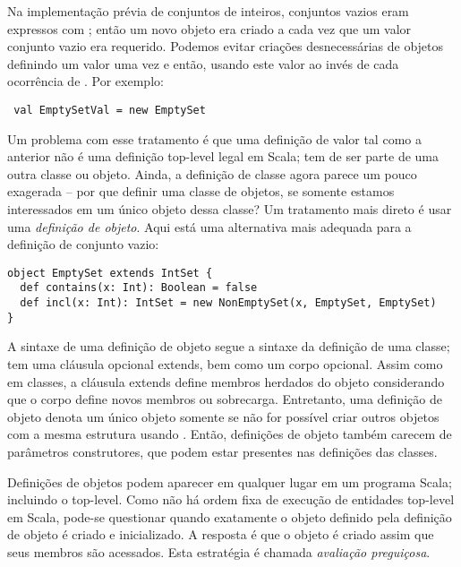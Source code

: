Na implementa\c{c}\~{a}o pr\'{e}via de conjuntos de inteiros, conjuntos vazios eram expressos
com ; ent\~{a}o um novo objeto era criado a cada vez que um valor
conjunto vazio era requerido. Podemos evitar cria\c{c}\~{o}es desnecess\'{a}rias de objetos 
definindo um valor  uma vez e ent\~{a}o, usando este valor ao inv\'{e}s de cada 
ocorr\^{e}ncia de . Por exemplo:
 \begin{lstlisting}
 val EmptySetVal = new EmptySet
 \end{lstlisting}

Um problema com esse tratamento \'{e} que uma defini\c{c}\~{a}o de valor tal como a anterior
n\~{a}o \'{e} uma defini\c{c}\~{a}o top-level legal em Scala; tem de ser parte de uma outra classe 
ou objeto. Ainda, a defini\c{c}\~{a}o de classe  agora parece um pouco exagerada -- 
por que definir uma classe de objetos, se somente estamos interessados em um \'{u}nico objeto 
dessa classe? Um tratamento mais direto \'{e} usar uma {\em defini\c{c}\~{a}o de objeto}. Aqui est\'{a} 
uma alternativa mais adequada para a defini\c{c}\~{a}o de conjunto vazio:
\begin{lstlisting}
object EmptySet extends IntSet {
  def contains(x: Int): Boolean = false
  def incl(x: Int): IntSet = new NonEmptySet(x, EmptySet, EmptySet)
}
\end{lstlisting}

A sintaxe de uma defini\c{c}\~{a}o de objeto segue a sintaxe da defini\c{c}\~{a}o de uma 
classe; tem uma cl\'{a}usula opcional extends, bem como um corpo opcional. 
Assim como em classes, a cl\'{a}usula extends define membros herdados do objeto 
considerando que o corpo define novos membros ou sobrecarga. Entretanto, uma 
defini\c{c}\~{a}o de objeto denota um \'{u}nico objeto somente se n\~{a}o for poss\'{i}vel criar
outros objetos com a mesma estrutura usando . Ent\~{a}o, defini\c{c}\~{o}es de
objeto tamb\'{e}m carecem de par\^{a}metros construtores, que podem estar presentes
nas defini\c{c}\~{o}es das classes.

Defini\c{c}\~{o}es de objetos podem aparecer em qualquer lugar em um programa Scala;
incluindo o top-level. Como n\~{a}o h\'{a} ordem fixa de execu\c{c}\~{a}o de entidades
top-level em Scala, pode-se questionar quando exatamente o objeto definido 
pela defini\c{c}\~{a}o de objeto \'{e} criado e inicializado. A resposta \'{e} que o objeto 
\'{e} criado assim que seus membros s\~{a}o acessados. Esta estrat\'{e}gia \'{e} chamada 
{\em avalia\c{c}\~{a}o pregui\c{c}osa}.

